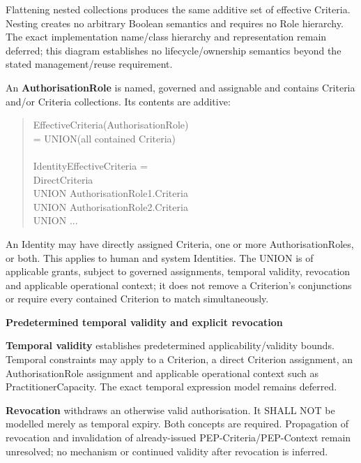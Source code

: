 Flattening nested collections produces the same additive set of effective
Criteria. Nesting creates no arbitrary Boolean semantics and requires no Role
hierarchy. The exact implementation name/class hierarchy and representation
remain deferred; this diagram establishes no lifecycle/ownership semantics
beyond the stated management/reuse requirement.



An \textbf{AuthorisationRole} is named, governed and assignable and contains Criteria
and/or Criteria collections. Its contents are additive:



\begin{quote}\small\ttfamily
EffectiveCriteria(AuthorisationRole)\\
    = UNION(all contained Criteria)\\
\\
IdentityEffectiveCriteria =\\
    DirectCriteria\\
    UNION AuthorisationRole1.Criteria\\
    UNION AuthorisationRole2.Criteria\\
    UNION ...\\

\end{quote}


An Identity may have directly assigned Criteria, one or more AuthorisationRoles,
or both. This applies to human and system Identities. The UNION is of applicable
grants, subject to governed assignments, temporal validity, revocation and
applicable operational context; it does not remove a Criterion's conjunctions
or require every contained Criterion to match simultaneously.







\par\medskip\textbf{Predetermined temporal validity and explicit revocation}\par


\textbf{Temporal validity} establishes predetermined applicability/validity bounds.
Temporal constraints may apply to a Criterion, a direct Criterion assignment,
an AuthorisationRole assignment and applicable operational context such as
PractitionerCapacity. The exact temporal expression model remains deferred.



\textbf{Revocation} withdraws an otherwise valid authorisation. It SHALL NOT be
modelled merely as temporal expiry. Both concepts are required. Propagation of
revocation and invalidation of already-issued PEP-Criteria/PEP-Context remain
unresolved; no mechanism or continued validity after revocation is inferred.








